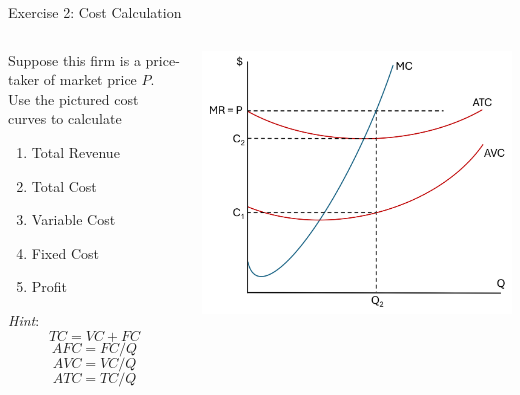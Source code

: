 \documentclass[9pt]{beamer}
\begin{document}
\begin{frame}{Exercise 2: Cost Calculation}
    \begin{columns}[c]
        \begin{column}{0.5\textwidth}
        Suppose this firm is a price-taker of market price $P$. Use the pictured cost curves to calculate
        \vspace{5pt}
            \begin{enumerate}
                \item Total Revenue
                \item Total Cost
                \item Variable Cost
                \item Fixed Cost
                \item Profit
            \end{enumerate}
            \vspace{5pt}
            \textit{Hint}: \[TC = VC + FC\] \[AFC = FC/Q\] \[AVC = VC/Q\] \[ATC = TC/Q\]
        \end{column}
        \begin{column}{0.5\textwidth}
            \includegraphics[width=\linewidth]{cost_exercise.png}
        \end{column}
    \end{columns}
\end{frame}
\end{document}
